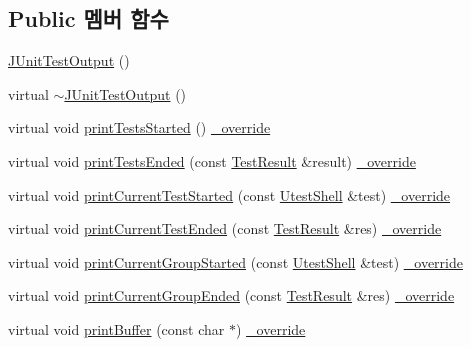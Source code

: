 \subsection*{Public 멤버 함수}
\begin{DoxyCompactItemize}
\item 
\hyperlink{class_j_unit_test_output_a571fded84399f35c7011435458f8872a}{J\+Unit\+Test\+Output} ()
\item 
virtual \hyperlink{class_j_unit_test_output_a2ef171e82a0b4193ea48c1b2630bd16d}{$\sim$\+J\+Unit\+Test\+Output} ()
\item 
virtual void \hyperlink{class_j_unit_test_output_ab5c5fefbc905a76fa0bba417100fc1ea}{print\+Tests\+Started} () \hyperlink{_cpp_u_test_config_8h_a049bea15dd750e15869863c94c1efc3b}{\+\_\+override}
\item 
virtual void \hyperlink{class_j_unit_test_output_abab328a7ac6096c01c17335985626791}{print\+Tests\+Ended} (const \hyperlink{class_test_result}{Test\+Result} \&result) \hyperlink{_cpp_u_test_config_8h_a049bea15dd750e15869863c94c1efc3b}{\+\_\+override}
\item 
virtual void \hyperlink{class_j_unit_test_output_a5b7509d804ba2fb3be690077ae93345a}{print\+Current\+Test\+Started} (const \hyperlink{class_utest_shell}{Utest\+Shell} \&test) \hyperlink{_cpp_u_test_config_8h_a049bea15dd750e15869863c94c1efc3b}{\+\_\+override}
\item 
virtual void \hyperlink{class_j_unit_test_output_a03ceb1aab29f845f5d0a6e5bb4124885}{print\+Current\+Test\+Ended} (const \hyperlink{class_test_result}{Test\+Result} \&res) \hyperlink{_cpp_u_test_config_8h_a049bea15dd750e15869863c94c1efc3b}{\+\_\+override}
\item 
virtual void \hyperlink{class_j_unit_test_output_a0478e2d3cabe1da8114c90f0ae7e7227}{print\+Current\+Group\+Started} (const \hyperlink{class_utest_shell}{Utest\+Shell} \&test) \hyperlink{_cpp_u_test_config_8h_a049bea15dd750e15869863c94c1efc3b}{\+\_\+override}
\item 
virtual void \hyperlink{class_j_unit_test_output_a19ba7b19942e492a0eab6ac4d3d90286}{print\+Current\+Group\+Ended} (const \hyperlink{class_test_result}{Test\+Result} \&res) \hyperlink{_cpp_u_test_config_8h_a049bea15dd750e15869863c94c1efc3b}{\+\_\+override}
\item 
virtual void \hyperlink{class_j_unit_test_output_abf2e01aef95538a13475f442d3630b9d}{print\+Buffer} (const char $\ast$) \hyperlink{_cpp_u_test_config_8h_a049bea15dd750e15869863c94c1efc3b}{\+\_\+override}
\item 

\end{DoxyCompactItemize}
